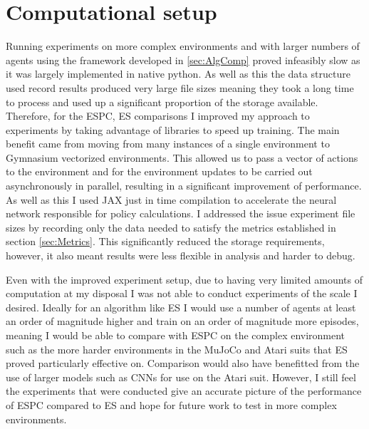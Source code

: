 \section{Computational setup}
Running experiments on more complex environments and with larger numbers of agents using the framework developed in \ref{sec:AlgComp} proved infeasibly slow as it was largely implemented in native python. As well as this the data structure used record results produced very large file sizes meaning they took a long time to process and used up a significant proportion of the storage available. Therefore, for the ESPC, ES comparisons I improved my approach to experiments by taking advantage of libraries to speed up training. The main benefit came from moving from many instances of a single environment to Gymnasium vectorized environments. This allowed us to pass a vector of actions to the environment and for the environment updates to be carried out asynchronously in parallel, resulting in a significant improvement of performance. As well as this I used JAX \cite{JAX} just in time compilation to accelerate the neural network responsible for policy calculations. I addressed the issue experiment file sizes by recording only the data needed to satisfy the metrics established in section \ref{sec:Metrics}. This significantly reduced the storage requirements, however, it also meant results were less flexible in analysis and harder to debug.

Even with the improved experiment setup, due to having very limited amounts of computation at my disposal I was not able to conduct experiments of the scale I desired. Ideally for an algorithm like ES I would use a number of agents at least an order of magnitude higher and train on an order of magnitude more episodes, meaning I would be able to compare with ESPC on the complex environment such as the more harder environments in the MuJoCo \cite{MuJoCo} and Atari \cite{Atari} suits that ES proved particularly effective on. Comparison would also have benefitted from the use of larger models such as CNNs for use on the Atari suit. However, I still feel the experiments that were conducted give an accurate picture of the performance of ESPC compared to ES and hope for future work to test in more complex environments.

